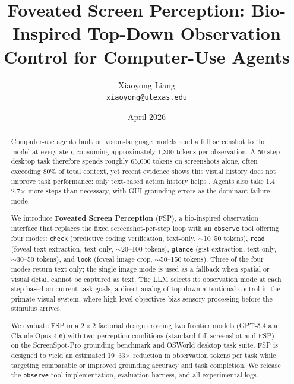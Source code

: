 \documentclass[11pt,a4paper]{article}
\title{Foveated Screen Perception: Bio-Inspired Top-Down Observation Control for Computer-Use Agents}
\author{
  Xiaoyong Liang \\
  \texttt{xiaoyong@utexas.edu}
}
\date{April 2026}
\begin{document}
\maketitle


\begin{abstract}
Computer-use agents built on vision-language models send a full screenshot to the model at every step, consuming approximately 1{,}300 tokens per observation.
A 50-step desktop task therefore spends roughly 65{,}000 tokens on screenshots alone, often exceeding 80\% of total context, yet recent evidence shows this visual history does not improve task performance: only text-based action history helps \cite{osworld-human}.
Agents also take 1.4--2.7$\times$ more steps than necessary, with GUI grounding errors as the dominant failure mode.

We introduce \textbf{Foveated Screen Perception} (FSP), a bio-inspired observation interface that replaces the fixed screenshot-per-step loop with an \texttt{observe} tool offering four modes: \texttt{check} (predictive coding verification, text-only, $\sim$10--50 tokens), \texttt{read} (foveal text extraction, text-only, $\sim$20--100 tokens), \texttt{glance} (gist extraction, text-only, $\sim$30--50 tokens), and \texttt{look} (foveal image crop, $\sim$50--150 tokens).
Three of the four modes return text only; the single image mode is used as a fallback when spatial or visual detail cannot be captured as text.
The LLM selects its observation mode at each step based on current task goals, a direct analog of top-down attentional control in the primate visual system, where high-level objectives bias sensory processing before the stimulus arrives.

We evaluate FSP in a $2 \times 2$ factorial design crossing two frontier models (GPT-5.4 and Claude Opus 4.6) with two perception conditions (standard full-screenshot and FSP) on the ScreenSpot-Pro grounding benchmark and OSWorld desktop task suite.
FSP is designed to yield an estimated 19--33$\times$ reduction in observation tokens per task while targeting comparable or improved grounding accuracy and task completion.
We release the \texttt{observe} tool implementation, evaluation harness, and all experimental logs.
\end{abstract}


\end{document}
